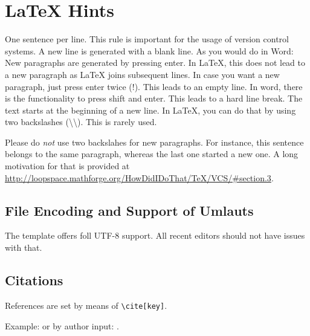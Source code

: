
\chapter{LaTeX Hints}
\label{chap:latexhints}

One sentence per line.
This rule is important for the usage of version control systems.
A new line is generated with a blank line.
As you would do in Word:
New paragraphs are generated by pressing enter.
In LaTeX, this does not lead to a new paragraph as LaTeX joins subsequent lines.
In case you want a new paragraph, just press enter twice (!).
This leads to an empty line.
In word, there is the functionality to press shift and enter.
This leads to a hard line break.
The text starts at the beginning of a new line.
In LaTeX, you can do that by using two backslashes (\textbackslash\textbackslash).
This is rarely used.

Please do \textit{not} use two backslahes for new paragraphs.
For instance, this sentence belongs to the same paragraph, whereas the last one started a new one.
A long motivation for that is provided at \url{http://loopspace.mathforge.org/HowDidIDoThat/TeX/VCS/#section.3}.

\section{File Encoding and Support of Umlauts}
\label{sec:firstsectioninlatexhints}
The template offers foll UTF-8 support.
All recent editors should not have issues with that.

\section{Citations}


References are set by means of \texttt{\textbackslash cite[key]}.

\begin{filecontents*}{\democodefile}
Example: \cite{WSPA} or by author input: \citet{WSPA}.
\end{filecontents*}

